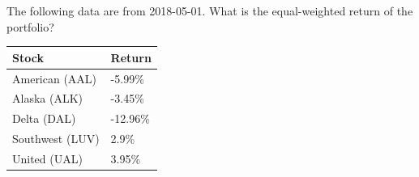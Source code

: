 The following data are from 2018-05-01. What is the equal-weighted return of the portfolio?
\begin{center}
	\begin{tabular}{l|l}
		\textbf{Stock} & \textbf{Return} \\ \hline
		American (AAL) & -5.99\% \\
		Alaska (ALK) & -3.45\% \\
		Delta (DAL) & -12.96\% \\
		Southwest (LUV) & 2.9\% \\
		United (UAL) & 3.95\%\\\hline
	\end{tabular}
\end{center}
